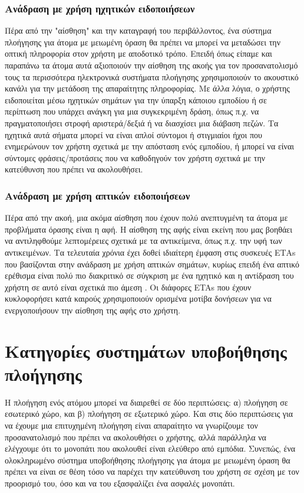 \subsubsection{Ανάδραση με χρήση ηχητικών ειδοποιήσεων}
Πέρα από την "αίσθηση" και την καταγραφή του περιβάλλοντος, ένα σύστημα πλοήγησης για άτομα με μειωμένη όραση θα πρέπει να μπορεί να μεταδώσει την οπτική πληροφορία στον χρήστη με αποδοτικό τρόπο. Επειδή όπως είπαμε και παραπάνω τα άτομα αυτά αξιοποιούν την αίσθηση της ακοής για τον προσανατολισμό τους τα περισσότερα ηλεκτρονικά συστήματα πλοήγησης χρησιμοποιούν το ακουστικό κανάλι για την μετάδοση της απαραίτητης πληροφορίας. Με άλλα λόγια, ο χρήστης ειδοποιείται μέσω ηχητικών σημάτων για την ύπαρξη κάποιου εμποδίου ή σε περίπτωση που υπάρχει ανάγκη για μια συγκεκριμένη δράση, όπως π.χ. να πραγματοποιήσει στροφή αριστερά/δεξιά ή να διασχίσει μια διάβαση πεζών. Τα ηχητικά αυτά σήματα μπορεί να είναι απλοί σύντομοι ή στιγμιαίοι ήχοι που ενημερώνουν τον χρήστη σχετικά με την απόσταση ενός εμποδίου, ή μπορεί να είναι σύντομες φράσεις/προτάσεις που να καθοδηγούν τον χρήστη σχετικά με την κατεύθυνση που πρέπει να ακολουθήσει.
\subsubsection{Ανάδραση με χρήση απτικών ειδοποιήσεων}
Πέρα από την ακοή, μια ακόμα αίσθηση που έχουν πολύ ανεπτυγμένη τα άτομα με προβλήματα όρασης είναι η αφή. Η αίσθηση της αφής είναι εκείνη που μας βοηθάει να αντιληφθούμε λεπτομέρειες σχετικά με τα αντικείμενα, όπως π.χ. την υφή των αντικειμένων. Τα τελευταία χρόνια έχει δοθεί ιδιαίτερη έμφαση στις συσκευές ΕΤΑs που βασίζονται στην ανάδραση με χρήση απτικών σημάτων, κυρίως επειδή ένα απτικό ερέθισμα είναι πολύ πιο διακριτικό σε σύγκριση με ένα ηχητικό και η αντίδραση του χρήστη σε αυτό είναι σχετικά πιο άμεση \cite{ng2012finger}. Οι διάφορες ETAs που έχουν κυκλοφορήσει κατά καιρούς χρησιμοποιούν ορισμένα μοτίβα δονήσεων για να ενεργοποιήσουν την αίσθηση της αφής στο χρήστη.



\section{Κατηγορίες συστημάτων υποβοήθησης πλοήγησης}
Η πλοήγηση ενός ατόμου μπορεί να διαιρεθεί σε δύο περιπτώσεις: α) πλοήγηση σε εσωτερικό χώρο, και β) πλοήγηση σε εξωτερικό χώρο. Και στις δύο περιπτώσεις για να έχουμε μια επιτυχημένη πλοήγηση είναι απαραίτητο να γνωρίζουμε τον προσανατολισμό που πρέπει να ακολουθήσει ο χρήστης, αλλά παράλληλα να ελέγχουμε ότι το μονοπάτι που ακολουθεί είναι ελεύθερο από εμπόδια. Συνεπώς, ένα ολοκληρωμένο σύστημα υποβοήθησης πλοήγησης για άτομα με μειωμένη όραση θα πρέπει να είναι σε θέση τόσο να παρέχει την κατεύθυνση του χρήστη σε σχέση με τον προορισμό του, όσο και να του εξασφαλίζει ένα ασφαλές μονοπάτι. 


